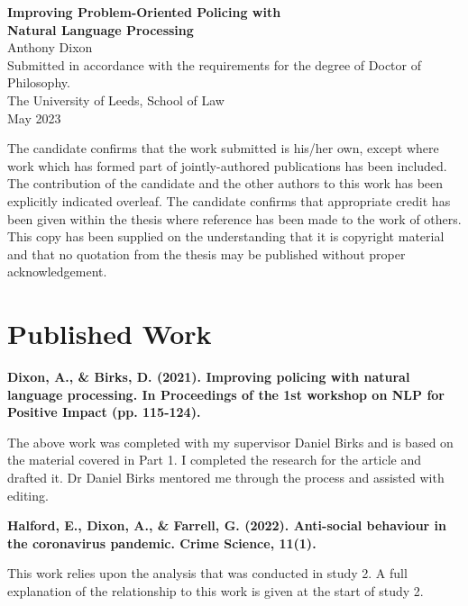 \documentclass[11pt, a4paper]{book}
\begin{document}
\pagestyle{empty} \thispagestyle{empty}
\begin{center}
{\LARGE \bf  Improving Problem-Oriented Policing with\\ Natural Language Processing}\\[5cm]

{\Large Anthony Dixon}\\[2cm]

{\large Submitted in accordance with the requirements for the degree of Doctor of Philosophy.}\\[1cm]


{\large The University of Leeds, School of Law}\\[1cm]

{\Large May 2023}\\ \vfill

{\large
The candidate confirms that the work submitted is his/her own, except where work which has formed part of jointly-authored publications has been included. The contribution of the candidate and the other authors to this work has been explicitly indicated overleaf. The candidate confirms that appropriate credit has been given within the thesis where reference has been made to the work of others.
This copy has been supplied on the understanding that it is copyright material and that no quotation from the thesis may be published without proper acknowledgement.}
\end{center}

\newpage

\chapter*{Published Work}

{\bf Dixon, A., \& Birks, D. (2021). Improving policing with natural language processing. In Proceedings of the 1st workshop on NLP for Positive Impact (pp. 115-124).}

The above work was completed with my supervisor Daniel Birks and is based on the material covered in Part 1. I completed the research for the article and drafted it. Dr Daniel Birks mentored me through the process and assisted with editing.

{\bf Halford, E., Dixon, A., \& Farrell, G. (2022). Anti-social behaviour in the coronavirus pandemic. Crime Science, 11(1).}

This work relies upon the analysis that was conducted in study 2. A full explanation of the relationship to this work is given at the start of study 2.
\end{document}
